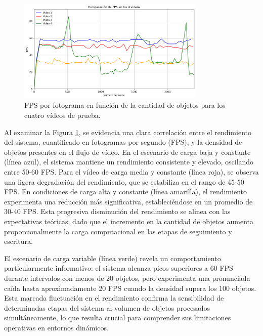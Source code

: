 \documentclass[11pt,spanish,listoffigures,listoftables]{tfgetsinf}
\begin{document}
\begin{figure}[H]
   \centering
   \includegraphics[width=0.8\textwidth]{excels/inferencia/cantidad_objetos/resultados/max_fps_4_videos/fps_comparison.png}
   \caption[FPS por fotograma en función de la cantidad de objetos para los cuatro vídeos de prueba]{FPS por fotograma en función de la cantidad de objetos para los cuatro vídeos de prueba.}
   \label{fig:fps_por_frame}
\end{figure}

Al examinar la Figura \ref{fig:fps_por_frame}, se evidencia una clara correlación entre el rendimiento del sistema, cuantificado en fotogramas por segundo (FPS), y la densidad de objetos presentes en el flujo de vídeo. En el escenario de carga baja y constante (línea azul), el sistema mantiene un rendimiento consistente y elevado, oscilando entre 50-60 FPS. Para el vídeo de carga media y constante (línea roja), se observa una ligera degradación del rendimiento, que se estabiliza en el rango de 45-50 FPS. En condiciones de carga alta y constante (línea amarilla), el rendimiento experimenta una reducción más significativa, estableciéndose en un promedio de 30-40 FPS. Esta progresiva disminución del rendimiento se alinea con las expectativas teóricas, dado que el incremento en la cantidad de objetos aumenta proporcionalmente la carga computacional en las etapas de seguimiento y escritura.

El escenario de carga variable (línea verde) revela un comportamiento particularmente informativo: el sistema alcanza picos superiores a 60 FPS durante intervalos con menos de 20 objetos, pero experimenta una pronunciada caída hasta aproximadamente 20 FPS cuando la densidad supera los 100 objetos. Esta marcada fluctuación en el rendimiento confirma la sensibilidad de determinadas etapas del sistema al volumen de objetos procesados simultáneamente, lo que resulta crucial para comprender sus limitaciones operativas en entornos dinámicos.
\end{document}
